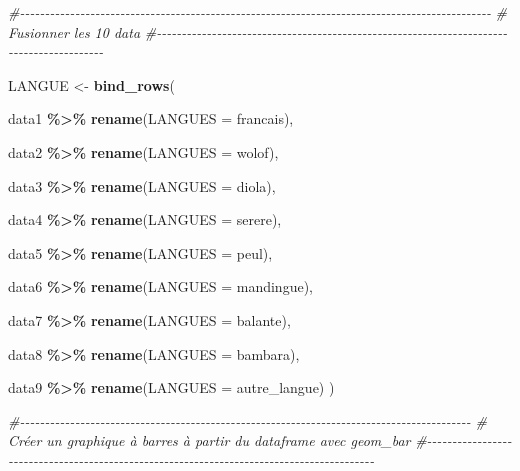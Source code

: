 \documentclass[
]{article}
\newenvironment{Shaded}{\begin{snugshade}}{\end{snugshade}}
\newcommand{\AttributeTok}[1]{\textcolor[rgb]{0.13,0.29,0.53}{#1}}
\newcommand{\CommentTok}[1]{\textcolor[rgb]{0.56,0.35,0.01}{\textit{#1}}}
\newcommand{\FunctionTok}[1]{\textcolor[rgb]{0.13,0.29,0.53}{\textbf{#1}}}
\newcommand{\NormalTok}[1]{#1}
\newcommand{\OtherTok}[1]{\textcolor[rgb]{0.56,0.35,0.01}{#1}}
\newcommand{\SpecialCharTok}[1]{\textcolor[rgb]{0.81,0.36,0.00}{\textbf{#1}}}
\begin{document}
\begin{Shaded}
\begin{Highlighting}[]
\CommentTok{\#{-}{-}{-}{-}{-}{-}{-}{-}{-}{-}{-}{-}{-}{-}{-}{-}{-}{-}{-}{-}{-}{-}{-}{-}{-}{-}{-}{-}{-}{-}{-}{-}{-}{-}{-}{-}{-}{-}{-}{-}{-}{-}{-}{-}{-}{-}{-}{-}{-}{-}{-}{-}{-}{-}{-}{-}{-}{-}{-}{-}{-}{-}{-}{-}{-}{-}{-}{-}{-}{-}{-}{-}{-}{-}{-}{-}{-}{-}{-}{-}{-}{-}{-}{-}{-}{-}{-}{-}{-}{-}{-}{-}{-}{-}}
\CommentTok{\#    Fusionner les 10 data}
\CommentTok{\#{-}{-}{-}{-}{-}{-}{-}{-}{-}{-}{-}{-}{-}{-}{-}{-}{-}{-}{-}{-}{-}{-}{-}{-}{-}{-}{-}{-}{-}{-}{-}{-}{-}{-}{-}{-}{-}{-}{-}{-}{-}{-}{-}{-}{-}{-}{-}{-}{-}{-}{-}{-}{-}{-}{-}{-}{-}{-}{-}{-}{-}{-}{-}{-}{-}{-}{-}{-}{-}{-}{-}{-}{-}{-}{-}{-}{-}{-}{-}{-}{-}{-}{-}{-}{-}{-}{-}{-}{-}}

\NormalTok{LANGUE }\OtherTok{\textless{}{-}} \FunctionTok{bind\_rows}\NormalTok{(}
  
\NormalTok{data1 }\SpecialCharTok{\%\textgreater{}\%} 
  \FunctionTok{rename}\NormalTok{(}\AttributeTok{LANGUES =}\NormalTok{ francais),}

\NormalTok{data2 }\SpecialCharTok{\%\textgreater{}\%} 
  \FunctionTok{rename}\NormalTok{(}\AttributeTok{LANGUES =}\NormalTok{ wolof),}

\NormalTok{data3 }\SpecialCharTok{\%\textgreater{}\%} 
  \FunctionTok{rename}\NormalTok{(}\AttributeTok{LANGUES =}\NormalTok{ diola),}

\NormalTok{data4 }\SpecialCharTok{\%\textgreater{}\%} 
  \FunctionTok{rename}\NormalTok{(}\AttributeTok{LANGUES =}\NormalTok{ serere),}

\NormalTok{data5 }\SpecialCharTok{\%\textgreater{}\%} 
  \FunctionTok{rename}\NormalTok{(}\AttributeTok{LANGUES =}\NormalTok{ peul),}

\NormalTok{data6 }\SpecialCharTok{\%\textgreater{}\%} 
  \FunctionTok{rename}\NormalTok{(}\AttributeTok{LANGUES =}\NormalTok{ mandingue),}

\NormalTok{data7 }\SpecialCharTok{\%\textgreater{}\%} 
  \FunctionTok{rename}\NormalTok{(}\AttributeTok{LANGUES =}\NormalTok{ balante),}

\NormalTok{data8 }\SpecialCharTok{\%\textgreater{}\%} 
  \FunctionTok{rename}\NormalTok{(}\AttributeTok{LANGUES =}\NormalTok{ bambara),}

\NormalTok{data9 }\SpecialCharTok{\%\textgreater{}\%} 
  \FunctionTok{rename}\NormalTok{(}\AttributeTok{LANGUES =}\NormalTok{ autre\_langue)}
\NormalTok{)}


\CommentTok{\#{-}{-}{-}{-}{-}{-}{-}{-}{-}{-}{-}{-}{-}{-}{-}{-}{-}{-}{-}{-}{-}{-}{-}{-}{-}{-}{-}{-}{-}{-}{-}{-}{-}{-}{-}{-}{-}{-}{-}{-}{-}{-}{-}{-}{-}{-}{-}{-}{-}{-}{-}{-}{-}{-}{-}{-}{-}{-}{-}{-}{-}{-}{-}{-}{-}{-}{-}{-}{-}{-}{-}{-}{-}{-}{-}{-}{-}{-}{-}{-}{-}{-}{-}{-}{-}{-}{-}{-}{-}{-}}
\CommentTok{\#  Créer un graphique à barres à partir du dataframe avec geom\_bar}
\CommentTok{\#{-}{-}{-}{-}{-}{-}{-}{-}{-}{-}{-}{-}{-}{-}{-}{-}{-}{-}{-}{-}{-}{-}{-}{-}{-}{-}{-}{-}{-}{-}{-}{-}{-}{-}{-}{-}{-}{-}{-}{-}{-}{-}{-}{-}{-}{-}{-}{-}{-}{-}{-}{-}{-}{-}{-}{-}{-}{-}{-}{-}{-}{-}{-}{-}{-}{-}{-}{-}{-}{-}{-}{-}{-}{-}{-}{-}{-}{-}{-}{-}{-}{-}{-}{-}{-}{-}{-}{-}{-}{-}}


\end{Highlighting}
\end{Shaded}
\end{document}
